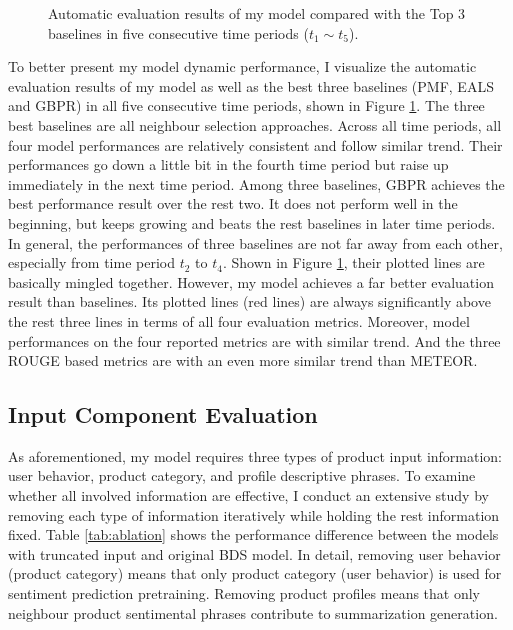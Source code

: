 \begin{figure}
	\caption{Automatic evaluation results of my model compared with the Top 3 baselines in five consecutive time periods ($t_1 \sim t_5$).} 
	\label{fig:auto-eval} 
\end{figure}
To better present my model dynamic performance, I visualize the automatic evaluation results of my model as well as  the best three baselines (PMF, EALS and GBPR) in all five consecutive time periods, shown in Figure \ref{fig:auto-eval}. The three best baselines are all neighbour selection approaches. Across all time periods, all four model performances are relatively consistent and follow similar trend. Their performances go down a little bit in the fourth time period but raise up immediately in the next time period. Among three baselines, GBPR achieves the best performance result over the rest two. It does not perform well in the beginning, but keeps growing and beats the rest baselines in later time periods. In general, the performances of three baselines are not far away from each other, especially from time period $t_2$ to $t_4$. Shown in Figure \ref{fig:auto-eval}, their plotted lines are basically mingled together. However, my model achieves a far better evaluation result than baselines. Its plotted lines (red lines) are always significantly above the rest three lines in terms of all four evaluation metrics. Moreover, model performances on the four reported metrics are with similar trend. And the three ROUGE based metrics are with an even more similar trend than METEOR. 




\subsection{Input Component Evaluation}


As aforementioned, my model requires three types of product input information: user behavior, product category, and profile descriptive phrases. To examine whether all involved information are effective, I conduct an extensive study by removing each type of information iteratively while holding the rest information fixed. Table \ref{tab:ablation} shows the performance difference between the models with truncated input and original BDS model. In detail, removing user behavior (product category) means that only product category (user behavior) is used for sentiment prediction pretraining. Removing product profiles means that only neighbour product sentimental phrases contribute to summarization generation. 
 
